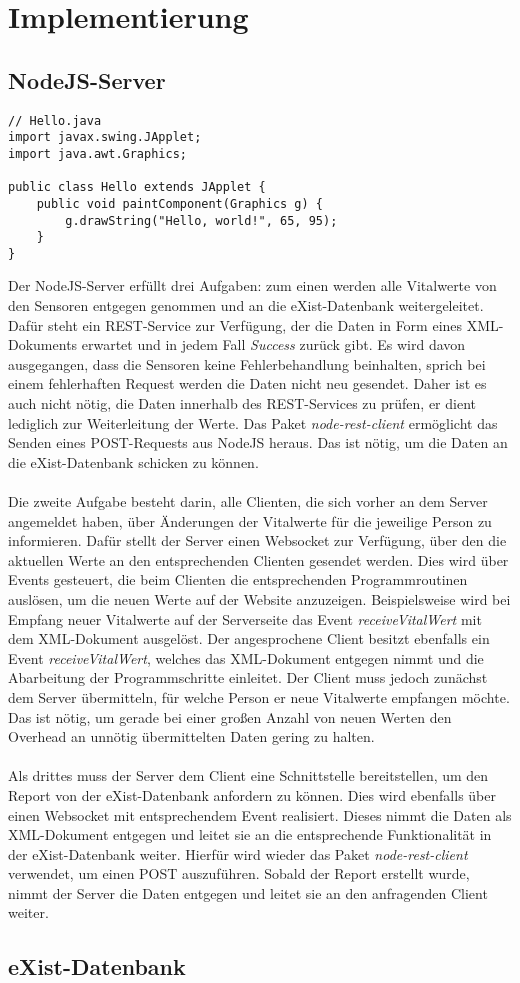 \section{Implementierung}

\subsection{NodeJS-Server}

\begin{lstlisting}
// Hello.java
import javax.swing.JApplet;
import java.awt.Graphics;

public class Hello extends JApplet {
    public void paintComponent(Graphics g) {
        g.drawString("Hello, world!", 65, 95);
    }    
}
\end{lstlisting}

Der NodeJS-Server erfüllt drei Aufgaben: zum einen werden alle Vitalwerte von den Sensoren entgegen genommen und an die eXist-Datenbank weitergeleitet. Dafür steht ein REST-Service zur Verfügung, der die Daten in Form eines XML-Dokuments erwartet und in jedem Fall \textit{Success} zurück gibt. Es wird davon ausgegangen, dass die Sensoren keine Fehlerbehandlung beinhalten, sprich bei einem fehlerhaften Request werden die Daten nicht neu gesendet. Daher ist es auch nicht nötig, die Daten innerhalb des REST-Services zu prüfen, er dient lediglich zur Weiterleitung der Werte. Das Paket \textit{node-rest-client} ermöglicht das Senden eines POST-Requests aus NodeJS heraus. Das ist nötig, um die Daten an die eXist-Datenbank schicken zu können. 
\\
\\
Die zweite Aufgabe besteht darin, alle Clienten, die sich vorher an dem Server angemeldet haben, über Änderungen der Vitalwerte für die jeweilige Person zu informieren. Dafür stellt der Server einen Websocket zur Verfügung, über den die aktuellen Werte an den entsprechenden Clienten gesendet werden. Dies wird über Events gesteuert, die beim Clienten die entsprechenden Programmroutinen auslösen, um die neuen Werte auf der Website anzuzeigen. Beispielsweise wird bei Empfang neuer Vitalwerte auf der Serverseite das Event \textit{receiveVitalWert} mit dem XML-Dokument ausgelöst. Der angesprochene Client besitzt ebenfalls ein Event \textit{receiveVitalWert}, welches das XML-Dokument entgegen nimmt und die Abarbeitung der Programmschritte einleitet. Der Client muss jedoch zunächst dem Server übermitteln, für welche Person er neue Vitalwerte empfangen möchte. Das ist nötig, um gerade bei einer großen Anzahl von neuen Werten den Overhead an unnötig übermittelten Daten gering zu halten.
\\
\\
Als drittes muss der Server dem Client eine Schnittstelle bereitstellen, um den Report von der eXist-Datenbank anfordern zu können. Dies wird ebenfalls über einen Websocket mit entsprechendem Event realisiert. Dieses nimmt die Daten als XML-Dokument entgegen und leitet sie an die entsprechende Funktionalität in der eXist-Datenbank weiter. Hierfür wird wieder das Paket \textit{node-rest-client} verwendet, um einen POST auszuführen. Sobald der Report erstellt wurde, nimmt der Server die Daten entgegen und leitet sie an den anfragenden Client weiter.

\subsection{eXist-Datenbank}
